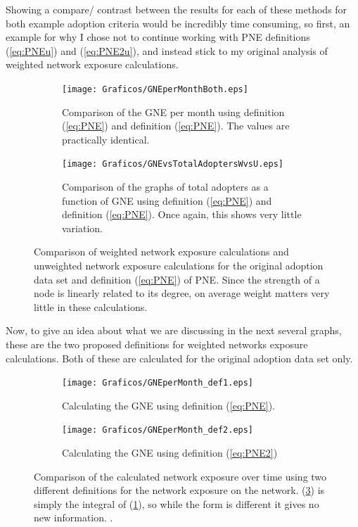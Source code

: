 \documentclass[12pt]{article}
\begin{document}
Showing a compare/ contrast between the results for each of these methods for both example adoption criteria would be incredibly time consuming, so first, an example for why I chose not to continue working with PNE definitions (\ref{eq:PNEu}) and (\ref{eq:PNE2u}), and instead stick to my original analysis of weighted network exposure calculations.

\begin{figure}[H]
    \begin{subfigure}[h]{.55\textwidth}
        \centering
        \texttt{[image: Graficos/GNEperMonthBoth.eps]}
        \caption{Comparison of the GNE per month using \newline definition (\ref{eq:PNE}) and definition (\ref{eq:PNE}). The values are \newline practically identical.}

    \end{subfigure}
    \begin{subfigure}[h]{.55\textwidth}
        \centering
	\texttt{[image: Graficos/GNEvsTotalAdoptersWvsU.eps]}
        \caption{Comparison of the graphs of total adopters as a function of GNE using definition (\ref{eq:PNE}) and definition (\ref{eq:PNE}). Once again, this shows very little variation.}
    \end{subfigure}
    \caption{Comparison of weighted network exposure calculations and unweighted network exposure calculations for the original adoption data set and definition (\ref{eq:PNE}) of PNE. Since the strength of a node is linearly related to its degree, on average weight matters very little in these calculations.}
\end{figure}

\newpage

Now, to give an idea about what we are discussing in the next several graphs, these are the two proposed definitions for weighted networks exposure calculations. Both of these are calculated for the original adoption data set only.

\begin{figure}[H]
    \begin{subfigure}[h]{.55\textwidth}
        \centering
        \texttt{[image: Graficos/GNEperMonth\_def1.eps]}
        \caption{Calculating the GNE using definition (\ref{eq:PNE}).}
        \label{fig:GNEdef1}
    \end{subfigure}
    \begin{subfigure}[h]{.55\textwidth}
        \centering
	\texttt{[image: Graficos/GNEperMonth\_def2.eps]}
        \caption{Calculating the GNE using definition (\ref{eq:PNE2})}
                \label{fig:GNEdef2}
    \end{subfigure}
    \caption{Comparison of the calculated network exposure over time using two different definitions for the network exposure on the network. (\ref{fig:GNEdef2}) is simply the integral of (\ref{fig:GNEdef1}), so while the form is different it gives no new information. \newline .}
\end{figure}
\end{document}
